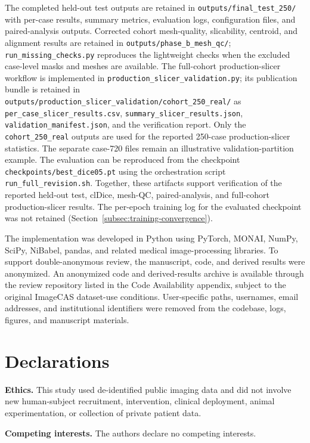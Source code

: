 \documentclass[anonymous]{iopjournal}
\begin{document}
The completed held-out test outputs are retained in \texttt{outputs/final\_test\_250/} with per-case results, summary metrics, evaluation logs, configuration files, and paired-analysis outputs. Corrected cohort mesh-quality, slicability, centroid, and alignment results are retained in \texttt{outputs/phase\_b\_mesh\_qc/}; \texttt{run\_missing\_checks.py} reproduces the lightweight checks when the excluded case-level masks and meshes are available. The full-cohort production-slicer workflow is implemented in \texttt{production\_slicer\_validation.py}; its publication bundle is retained in \texttt{outputs/production\_slicer\_validation/cohort\_250\_real/} as \texttt{per\_case\_slicer\_results.csv}, \texttt{summary\_slicer\_results.json}, \texttt{validation\_manifest.json}, and the verification report. Only the \texttt{cohort\_250\_real} outputs are used for the reported 250-case production-slicer statistics. The separate case-720 files remain an illustrative validation-partition example. The evaluation can be reproduced from the checkpoint \texttt{checkpoints/best\_dice05.pt} using the orchestration script \texttt{run\_full\_revision.sh}. Together, these artifacts support verification of the reported held-out test, clDice, mesh-QC, paired-analysis, and full-cohort production-slicer results. The per-epoch training log for the evaluated checkpoint was not retained (Section~\ref{subsec:training-convergence}).

The implementation was developed in Python using PyTorch, MONAI, NumPy, SciPy, NiBabel, pandas, and related medical image-processing libraries. To support double-anonymous review, the manuscript, code, and derived results were anonymized. An anonymized code and derived-results archive is available through the review repository listed in the Code Availability appendix, subject to the original ImageCAS dataset-use conditions. User-specific paths, usernames, email addresses, and institutional identifiers were removed from the codebase, logs, figures, and manuscript materials.

\section*{Declarations}

\textbf{Ethics.} This study used de-identified public imaging data and did not involve new human-subject recruitment, intervention, clinical deployment, animal experimentation, or collection of private patient data.

\textbf{Competing interests.} The authors declare no competing interests.
\end{document}
